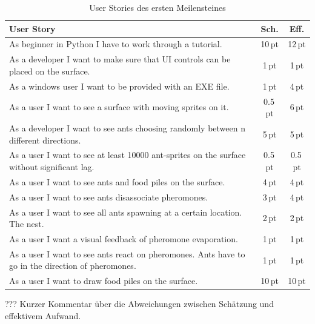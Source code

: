 
\begin{table}[H]
\small\sffamily\renewcommand{\arraystretch}{1.5}
\begin{tabular}{| p{12cm} | c | c |}
  \hline
  \bfseries{User Story} & \bfseries{Sch.} & \bfseries{Eff.}  \\
  \hline
  As beginner in Python I have to work through a tutorial. & 10\,pt & 12\,pt \\
  \hline
  As a developer I want to make sure that UI controls can be placed on the surface. & 1\,pt &1\,pt \\
  \hline
  As a windows user I want to be provided with an EXE file. & 1\,pt &4\,pt \\
  \hline
  As a user I want to see a surface with moving sprites on it. & 0.5\,pt & 6\,pt \\
  \hline
  As a developer I want to see ants choosing randomly between n different directions. & 5\,pt & 5\,pt \\
  \hline
  As a user I want to see at least 10000 ant-sprites on the surface without significant lag. & 0.5\,pt & 0.5\,pt \\
  \hline
  As a user I want to see ants and food piles on the surface. & 4\,pt & 4\,pt \\
  \hline
  As a user I want to see ants disassociate pheromones. & 3\,pt & 4\,pt \\
  \hline
  As a user I want to see all ants spawning at a certain location. The nest. & 2\,pt & 2\,pt \\
  \hline
  As a user I want a visual feedback of pheromone evaporation. & 1\,pt & 1\,pt \\
  \hline
  As a user I want to see ants react on pheromones. Ants have to go in the direction of pheromones. & 1\,pt & 1\,pt \\
  \hline
  As a user I want to draw food piles on the surface. & 10\,pt & 10\,pt \\
  \hline
\end{tabular}
\captionsetup{type=table} %
\caption{User Stories des ersten Meilensteines}
\end{table}


\vspace*{0.5cm}


???
Kurzer Kommentar über die Abweichungen zwischen Schätzung und effektivem Aufwand. \\


